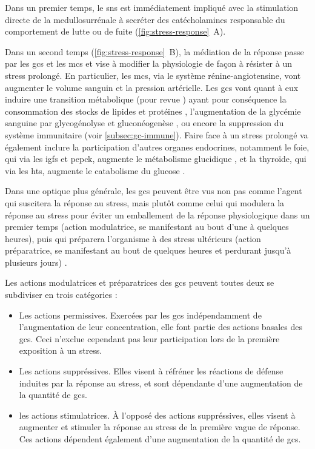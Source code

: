 \documentclass[../main.tex]{subfiles}
\begin{document}
Dans un premier temps, le \gls{sns} est immédiatement impliqué avec la stimulation directe de la medullosurrénale à secréter des catécholamines responsable du comportement de lutte ou de fuite (\autoref{fig:stress-response}~A).
\par
Dans un second temps (\autoref{fig:stress-response}~B), la médiation de la réponse passe par les \glspl{gc} et les \glspl{mc} et vise à modifier la physiologie de façon à résister à un stress prolongé.
En particulier, les \glspl{mc}, via le système rénine-angiotensine, vont augmenter le volume sanguin et la pression artérielle.
Les \glspl{gc} vont quant à eux induire une transition métabolique (pour revue \citealp{Munck2010,Weissman1990}) ayant pour conséquence la consommation des stocks de lipides et protéines \citep{Richard1993}, l'augmentation de la glycémie sanguine par glycogénolyse et gluconéogenèse \citep{Eigler1979}, ou encore la suppression du système immunitaire (voir \autoref{subsec:gc-immune}).
Faire face à un stress prolongé va également inclure la participation d'autres organes endocrines, notamment le foie, qui via les \glspl{igf} et \gls{pepck}, augmente le métabolisme glucidique \citep{Exton1987,Weissman1990}, et la thyroïde, qui via les \glspl{ht}, augmente le catabolisme du glucose \citep{Weissman1990}.
\par
Dans une optique plus générale, les \glspl{gc} peuvent être vus non pas comme l'agent qui suscitera la réponse au stress, mais plutôt comme celui qui modulera la réponse au stress pour éviter un emballement de la réponse physiologique dans un premier temps (action modulatrice, se manifestant au bout d'une à quelques heures), puis qui préparera l'organisme à des stress ultérieurs (action préparatrice, se manifestant au bout de quelques heures et perdurant jusqu'à plusieurs jours) \citet{Sapolsky2000}.
\par
Les actions modulatrices et préparatrices des \glspl{gc} peuvent toutes deux se subdiviser en trois catégories :
\begin{itemize}
\item Les actions permissives. Exercées par les \glspl{gc} indépendamment de l'augmentation de leur concentration, elle font partie des actions basales des \glspl{gc}. Ceci n'exclue cependant pas leur participation lors de la première exposition à un stress.
\item Les actions suppréssives. Elles visent à réfréner les réactions de défense induites par la réponse au stress, et sont dépendante d'une augmentation de la quantité de \glspl{gc}.
\item les actions stimulatrices. À l'opposé des actions suppréssives, elles visent à augmenter et stimuler la réponse au stress de la première vague de réponse.
Ces actions dépendent également d'une augmentation de la quantité de \glspl{gc}.
\end{itemize}
\end{document}
